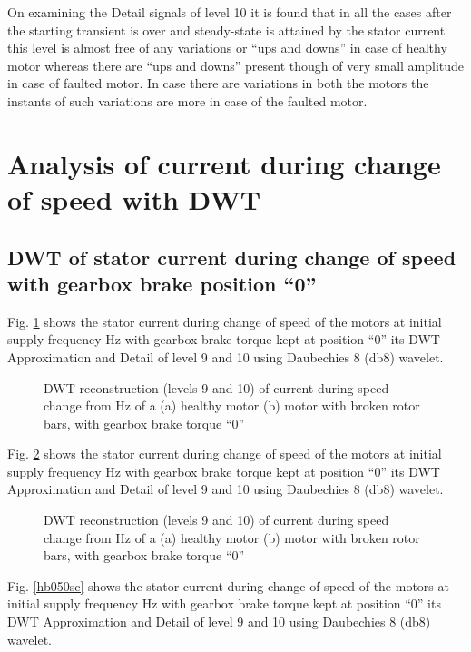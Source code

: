 \documentclass[a4paper,11pt]{report}
\begin{document}
On examining the Detail signals of level 10 it is found that in all the cases after the starting transient is over and steady-state is attained by the stator current this level is almost free of any variations or ``ups and downs'' in case of healthy motor whereas there are ``ups and downs'' present though of very small amplitude in case of faulted motor. In case there are variations in both the motors the instants of such variations are more in case of the faulted motor.

\clearpage
\section{Analysis of current during change of speed with DWT}
\subsection{DWT of stator current during change of speed with gearbox brake position ``0''}
Fig. \ref{hb030sc} shows the stator current during change of speed of the motors at initial supply frequency \unit[30]{Hz} with gearbox brake torque kept at position ``0'' its DWT Approximation and Detail of level 9 and 10 using Daubechies 8 (db8) wavelet.

\begin{figure}[h]
\centering
\subfigure[]{\texttt{[image: h030sc]}}
\subfigure[]{\texttt{[image: b030sc]}}
\caption{DWT reconstruction (levels 9 and 10) of current during speed change from \unit[30]{Hz} of a (a) healthy motor (b) motor with broken rotor bars, with gearbox brake torque ``0''} \label{hb030sc}
\end{figure}

\clearpage
Fig. \ref{hb040sc} shows the stator current during change of speed of the motors at initial supply frequency \unit[40]{Hz} with gearbox brake torque kept at position ``0'' its DWT Approximation and Detail of level 9 and 10 using Daubechies 8 (db8) wavelet.

\begin{figure}[h]
\centering
\subfigure[]{\texttt{[image: h040sc]}}
\subfigure[]{\texttt{[image: b040sc]}}
\caption{DWT reconstruction (levels 9 and 10) of current during speed change from \unit[40]{Hz} of a (a) healthy motor (b) motor with broken rotor bars, with gearbox brake torque ``0''} \label{hb040sc}
\end{figure}

\clearpage
Fig. \ref{hb050sc} shows the stator current during change of speed of the motors at initial supply frequency \unit[50]{Hz} with gearbox brake torque kept at position ``0'' its DWT Approximation and Detail of level 9 and 10 using Daubechies 8 (db8) wavelet.
\end{document}
